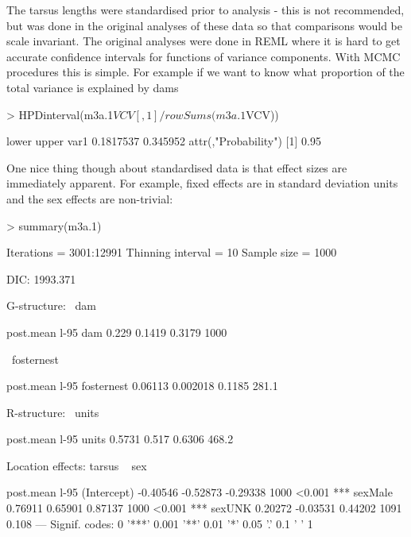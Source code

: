 \documentclass{article}
\begin{document}
The tarsus lengths were standardised prior to analysis - this is not recommended, but was done in the original analyses of these data \citep{Hadfield.2007} so that comparisons would be scale invariant. The original analyses were done in REML where it is hard to get accurate confidence intervals for functions of variance components.  With MCMC procedures this is simple. For example if we want to know what proportion of the total variance is explained by dams 

\begin{Schunk}
\begin{Sinput}
> HPDinterval(m3a.1$VCV[, 1]/rowSums(m3a.1$VCV))
\end{Sinput}
\begin{Soutput}
         lower    upper
var1 0.1817537 0.345952
attr(,"Probability")
[1] 0.95
\end{Soutput}
\end{Schunk}

One nice thing though about standardised data is that effect sizes are immediately apparent. For example, fixed effects are in standard deviation units and the sex effects are non-trivial:

\begin{Schunk}
\begin{Sinput}
> summary(m3a.1)
\end{Sinput}
\begin{Soutput}
 Iterations = 3001:12991
 Thinning interval  = 10
 Sample size  = 1000 

 DIC: 1993.371 

 G-structure:  ~dam

    post.mean l-95%
dam     0.229   0.1419   0.3179     1000

               ~fosternest

           post.mean l-95%
fosternest   0.06113 0.002018   0.1185    281.1

 R-structure:  ~units

      post.mean l-95%
units    0.5731    0.517   0.6306    468.2

 Location effects: tarsus ~ sex 

            post.mean l-95%
(Intercept)  -0.40546 -0.52873 -0.29338     1000 <0.001 ***
sexMale       0.76911  0.65901  0.87137     1000 <0.001 ***
sexUNK        0.20272 -0.03531  0.44202     1091  0.108    
---
Signif. codes:  0 '***' 0.001 '**' 0.01 '*' 0.05 '.' 0.1 ' ' 1 
\end{Soutput}
\end{Schunk}
\end{document}

